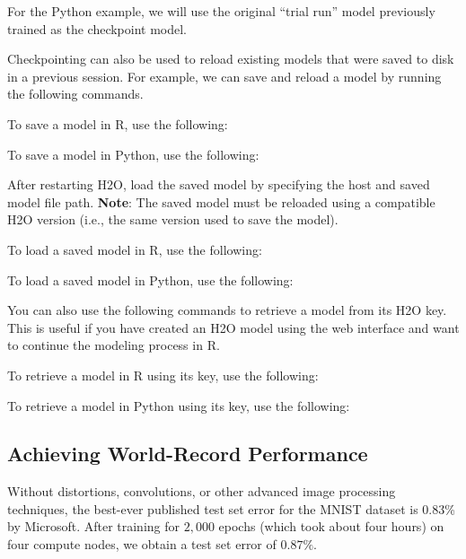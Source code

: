 {{\medskip
\waterExampleInPython
For the Python example, we will use the original ``trial run'' model previously trained as the checkpoint model.
\medskip


\noindent
Checkpointing can also be used to reload existing models that were saved to disk in a previous session. For example, we can save and reload a model by running the following commands.

\waterExampleInR
To save a model in R, use the following: 
\medskip

\medskip
\waterExampleInPython
To save a model in Python, use the following: 
\medskip



\normalsize

\noindent
After restarting  H2O, load the saved model by specifying the host and saved model file path. \textbf{Note}: The saved model must be reloaded using a compatible H2O version (i.e., the same version used to save the model).

\normalsize
\waterExampleInR
To load a saved model in R, use the following: 


\waterExampleInPython
To load a saved model in Python, use the following: 



\noindent
You can also use the following commands to retrieve a model from its H2O key. This is useful if you have created an H2O model using the web interface and want to continue the modeling process in R.

\waterExampleInR
To retrieve a model in R using its key, use the following: 


\waterExampleInPython
To retrieve a model in Python using its key, use the following: 


\subsection{Achieving World-Record Performance}

Without distortions, convolutions, or other advanced image processing techniques, the best-ever published test set error for the MNIST dataset is $0.83$\% by Microsoft. After training for $2,000$ epochs (which took about four hours) on four compute nodes, we obtain a test set error of $0.87\%$. 

}}
